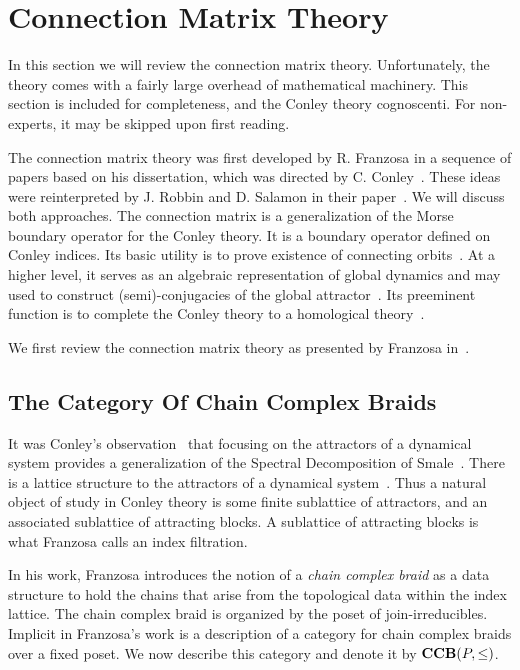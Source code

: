 
\section{Connection Matrix Theory}\label{sec:CMT}

In this section we will review the connection matrix theory.  Unfortunately, the theory comes with a fairly large overhead of mathematical machinery.  This section is included for completeness, and the Conley theory cognoscenti.  For non-experts, it may be skipped upon first reading.

The connection matrix theory was first developed by R. Franzosa in a sequence of papers based on his dissertation, which was directed by C. Conley~\cite{fran2,fran,fran3}.  These ideas were reinterpreted by J. Robbin and D. Salamon in their paper~\cite{salamon}.  We will discuss both approaches.  The connection matrix is a generalization of the Morse boundary operator for the Conley theory.   It is a boundary operator defined on Conley indices.  Its basic utility is to prove existence of connecting orbits~\cite{mpmw}.  At a higher level, it serves as an algebraic representation of global dynamics and may used to construct (semi)-conjugacies of the global attractor~\cite{dhmo,mcmodels,scalar}. Its preeminent function is to complete the Conley theory to a homological theory~\cite{mc}.  

We first review the connection matrix theory as presented by Franzosa in~\cite{fran}.

\subsection{The Category Of Chain Complex Braids}
It was Conley's observation~\cite{conley} that focusing on the attractors of a dynamical system provides a generalization of the Spectral Decomposition of Smale~\cite[Theorem 6.2]{smale}.  There is a lattice structure to the attractors of a dynamical system~\cite{salamon,lsa,lsa2}.  Thus a natural object of study in Conley theory is some finite sublattice of attractors, and an associated sublattice of attracting blocks.  A sublattice of attracting blocks is what Franzosa calls an index filtration.

In his work, Franzosa introduces the notion of a {\em chain complex braid} as a data structure to hold the chains that arise from the topological data within the index lattice.  The chain complex braid is organized by the poset of join-irreducibles.  Implicit in Franzosa's work is a description of a category for chain complex braids over a fixed poset.  We now describe this category and denote it by ${\bf CCB}(P,\leq)$.

